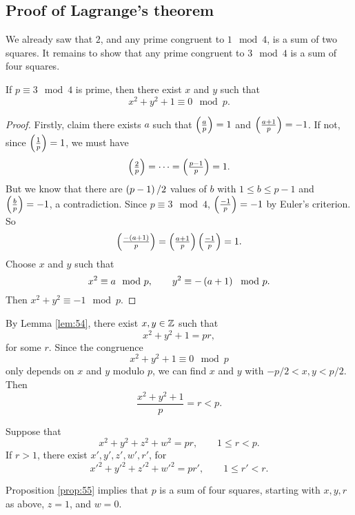\pagebreak

\subsection{Proof of Lagrange's theorem}

We already saw that $ 2 $, and any prime congruent to $ 1 \mod 4 $, is a sum of two squares. It remains to show that any prime congruent to $ 3 \mod 4 $ is a sum of four squares.


\begin{lemma}
\label{lem:54}
If $ p \equiv 3 \mod 4 $ is prime, then there exist $ x $ and $ y $ such that
$$ x^2 + y^2 + 1 \equiv 0 \mod p. $$
\end{lemma}

\begin{proof}
Firstly, claim there exists $ a $ such that $ \jacobi{a}{p} = 1 $ and $ \jacobi{a + 1}{p} = -1 $. If not, since $ \jacobi{1}{p} = 1 $, we must have
$$ \jacobi{2}{p} = \dots = \jacobi{p - 1}{p} = 1. $$
But we know that there are $ \br{p - 1} / 2 $ values of $ b $ with $ 1 \le b \le p - 1 $ and $ \jacobi{b}{p} = -1 $, a contradiction. Since $ p \equiv 3 \mod 4 $, $ \jacobi{-1}{p} = -1 $ by Euler's criterion. So
$$ \jacobi{-\br{a + 1}}{p} = \jacobi{a + 1}{p}\jacobi{-1}{p} = 1. $$
Choose $ x $ and $ y $ such that
$$ x^2 \equiv a \mod p, \qquad y^2 \equiv -\br{a + 1} \mod p. $$
Then $ x^2 + y^2 \equiv -1 \mod p $.
\end{proof}

By Lemma \ref{lem:54}, there exist $ x, y \in \mathbb{Z} $ such that
$$ x^2 + y^2 + 1 = pr, $$
for some $ r $. Since the congruence
$$ x^2 + y^2 + 1 \equiv 0 \mod p $$
only depends on $ x $ and $ y $ modulo $ p $, we can find $ x $ and $ y $ with $ -p / 2 < x, y < p / 2 $. Then
$$ \dfrac{x^2 + y^2 + 1}{p} = r < p. $$

\begin{proposition}
\label{prop:55}
Suppose that
$$ x^2 + y^2 + z^2 + w^2 = pr, \qquad 1 \le r < p. $$
If $ r > 1 $, there exist $ x', y', z', w', r' $, for
$$ x'^2 + y'^2 + z'^2 + w'^2 = pr', \qquad 1 \le r' < r. $$
\end{proposition}

Proposition \ref{prop:55} implies that $ p $ is a sum of four squares, starting with $ x, y, r $ as above, $ z = 1 $, and $ w = 0 $.

